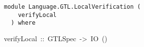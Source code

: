 \label{module:Language.GTL.LocalVerification}
\haddockbeginheader
{\haddockverb\begin{verbatim}
module Language.GTL.LocalVerification (
    verifyLocal
  ) where\end{verbatim}}
\haddockendheader

\begin{haddockdesc}
\item[
verifyLocal\ ::\ GTLSpec\ ->\ IO\ ()
]
\end{haddockdesc}